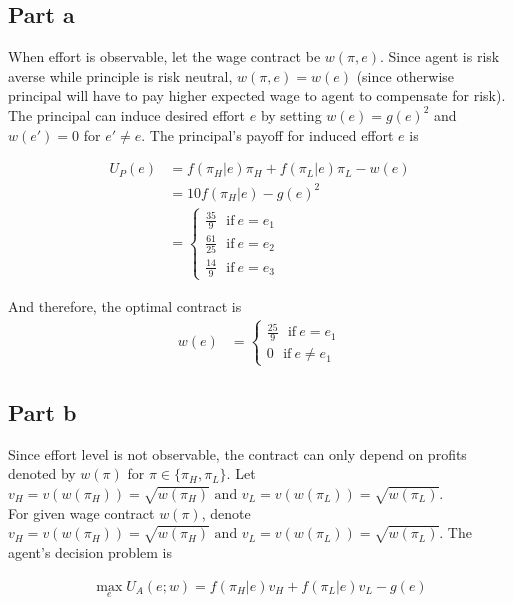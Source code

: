 \subsection*{Part a}

When effort is observable, let the wage contract be $w(\pi, e)$. Since agent is risk averse while principle is risk neutral, $w(\pi, e) = w(e)$ (since otherwise principal will have to pay higher expected wage to agent to compensate for risk).\\

The principal can induce desired effort $e$ by setting $w(e) = g(e)^2$ and $w(e') = 0$ for $e' \neq e$. The principal's payoff for induced effort $e$ is 

\begin{align*}
    U_P(e) &= f(\pi_H|e)\pi_H + f(\pi_L|e)\pi_L - w(e) \\
    &= 10f(\pi_H|e) - g(e)^2\\
    &= \begin{cases}
        \frac{35}{9}~~~\text{if}~e = e_1\\
        \frac{61}{25}~~~\text{if}~e = e_2\\
        \frac{14}{9}~~~\text{if}~e = e_3
    \end{cases}
\end{align*}

And therefore, the optimal contract is 
\begin{align*}
    w(e)&= \begin{cases}
        \frac{25}{9}~~~\text{if}~e = e_1\\
        0~~~\text{if}~e \neq e_1
    \end{cases}
\end{align*}

\subsection*{Part b}
Since effort level is not observable, the contract can only depend on profits denoted by $w(\pi)$ for $\pi \in \{\pi_H, \pi_L\}$. Let $v_H = v(w(\pi_H)) = \sqrt{w(\pi_H)} \text{ and } v_L = v(w(\pi_L)) = \sqrt{w(\pi_L)}$.\\

For given wage contract $w(\pi)$, denote $v_H = v(w(\pi_H)) = \sqrt{w(\pi_H)} \text{ and } v_L = v(w(\pi_L)) = \sqrt{w(\pi_L)}$. The agent's decision problem is

\begin{align*}
    \max_e U_A(e; w) =  f(\pi_H|e) v_H + f(\pi_L|e) v_L - g(e)
\end{align*}


